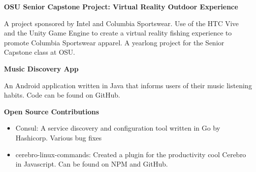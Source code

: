 \documentclass[1]{friggeri-cv} %
\begin{document}
\textbf{OSU Senior Capstone Project: Virtual Reality Outdoor Experience}

A project sponsored by Intel and Columbia Sportswear. Use of the HTC Vive and the Unity Game Engine to create a virtual reality fishing experience to promote Columbia Sportswear apparel. A yearlong project for the Senior Capstone class at OSU.

\textbf{Music Discovery App}

An Android application written in Java that informs users of their music listening habits. Code can be found on GitHub.

\textbf{Open Source Contributions}
\begin{itemize}
\item Consul: A service discovery and configuration tool written in Go by Hashicorp. Various bug fixes
\item cerebro-linux-commands: Created a plugin for the productivity cool Cerebro in Javascript. Can be found on NPM and GitHub.
\end{itemize}
\end{document}
